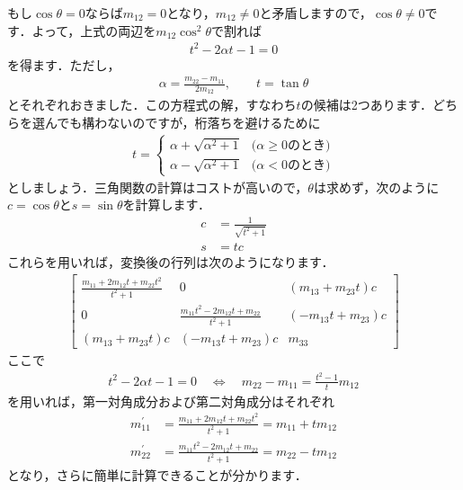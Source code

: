 ﻿\documentclass[a4paper]{jsarticle}
\begin{document}
もし$\cos\theta=0$ならば$m_{12}=0$となり，$m_{12}\neq 0$と矛盾しますので，$\cos\theta\neq 0$です．よって，上式の両辺を$m_{12}\cos^{2}\theta$で割れば
\begin{align*}
t^{2}-2\alpha t-1=0
\end{align*}
を得ます．ただし，
\begin{align*}
\alpha=\frac{m_{22}-m_{11}}{2m_{12}},\qquad
t=\tan\theta
\end{align*}
とそれぞれおきました．この方程式の解，すなわち$t$の候補は2つあります．どちらを選んでも構わないのですが，桁落ちを避けるために
\begin{align*}
t=\begin{cases}
\alpha+\sqrt{\alpha^{2}+1} & \mbox{($\alpha\geq 0$のとき)} \\
\alpha-\sqrt{\alpha^{2}+1} & \mbox{($\alpha<0$のとき)}
\end{cases}
\end{align*}
としましょう．三角関数の計算はコストが高いので，$\theta$は求めず，次のように$c=\cos\theta$と$s=\sin\theta$を計算します．
\begin{align*}
c&=\frac{1}{\sqrt{t^{2}+1}} \\
s&=tc
\end{align*}
これらを用いれば，変換後の行列は次のようになります．
\begin{align*}
\begin{bmatrix}
\frac{\displaystyle m_{11}+2m_{12}t+m_{22}t^{2}}{\displaystyle t^{2}+1} &
0 &
(m_{13}+m_{23}t)c \\
0 &
\frac{\displaystyle m_{11}t^{2}-2m_{12}t+m_{22}}{\displaystyle t^{2}+1} &
(-m_{13}t+m_{23})c \\
(m_{13}+m_{23}t)c &(-m_{13}t+m_{23})c & m_{33}
\end{bmatrix}
\end{align*}
ここで
\begin{align*}
t^{2}-2\alpha t-1=0
\quad\Leftrightarrow\quad
m_{22}-m_{11}=\frac{t^{2}-1}{t}m_{12}
\end{align*}
を用いれば，第一対角成分および第二対角成分はそれぞれ
\begin{align*}
m_{11}^{\prime}&=\frac{m_{11}+2m_{12}t+m_{22}t^{2}}{t^{2}+1}=m_{11}+tm_{12} \\
m_{22}^{\prime}&=\frac{m_{11}t^{2}-2m_{12}t+m_{22}}{t^{2}+1}=m_{22}-tm_{12}
\end{align*}
となり，さらに簡単に計算できることが分かります．
\end{document}
